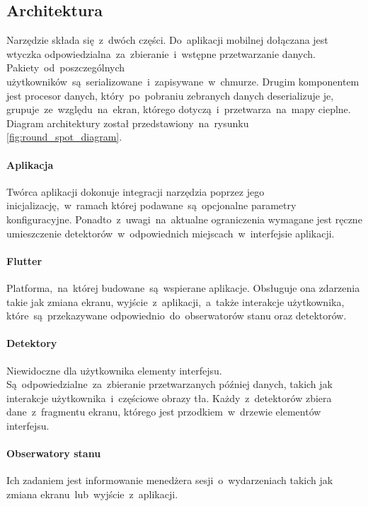 \subsection{Architektura}
Narzędzie składa się~z~dwóch części. Do~aplikacji mobilnej dołączana jest wtyczka odpowiedzialna~za~zbieranie~i~wstępne przetwarzanie danych. Pakiety~od~poszczególnych użytkowników~są~serializowane~i~zapisywane~w~chmurze. Drugim komponentem jest procesor danych, który~po~pobraniu zebranych danych deserializuje je, grupuje~ze~względu~na~ekran, którego dotyczą~i~przetwarza~na~mapy cieplne. Diagram architektury został przedstawiony~na~rysunku \ref{fig:round_spot_diagram}.
\bigskip
{}

\paragraph{Aplikacja}
Twórca aplikacji dokonuje integracji narzędzia poprzez jego inicjalizację,~w~ramach której podawane~są~opcjonalne parametry konfiguracyjne. Ponadto~z~uwagi~na~aktualne ograniczenia wymagane jest ręczne umieszczenie detektorów~w~odpowiednich miejscach~w~interfejsie aplikacji.

\paragraph{Flutter} Platforma,~na~której budowane~są~wspierane aplikacje. Obsługuje ona zdarzenia takie jak zmiana ekranu, wyjście~z~aplikacji,~a~także interakcje użytkownika, które~są~przekazywane odpowiednio~do~obserwatorów stanu oraz detektorów.

\paragraph{Detektory} 
\label{par:rs_detectors}
Niewidoczne dla użytkownika elementy interfejsu. Są~odpowiedzialne~za~zbieranie przetwarzanych później danych, takich jak interakcje użytkownika~i~częściowe obrazy tła. Każdy~z~detektorów zbiera dane~z~fragmentu ekranu, którego jest przodkiem~w~drzewie elementów interfejsu.

\paragraph{Obserwatory stanu} 
\label{par:rs_observers}
Ich zadaniem jest informowanie menedżera sesji~o~wydarzeniach takich jak zmiana ekranu~lub~wyjście~z~aplikacji.

